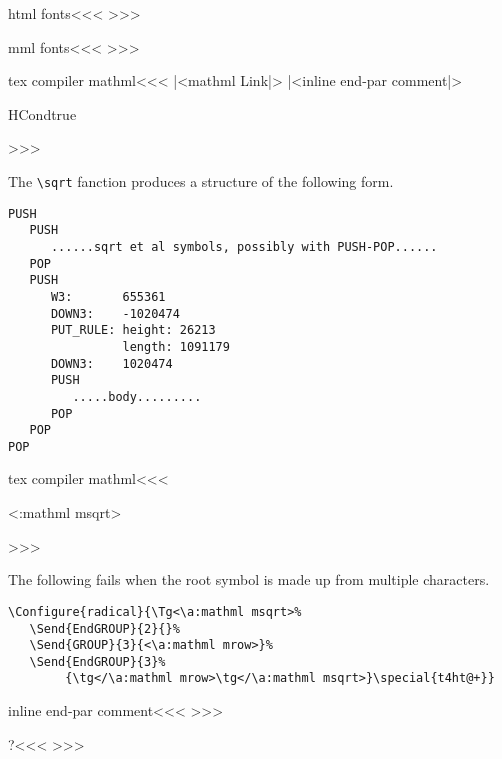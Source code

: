 {{{{{{\<html fonts\><<<
%
>>>

\<mml fonts\><<<
%
>>>

\<tex compiler mathml\><<<
\newif\ifmathml \mathmlfalse
\newif\ifmtext \mtextfalse
|<mathml Link|>
\def\IgnoreRule{\ht:special{t4ht@\string_}}
\def\EndIgnoreRule{\ht:special{t4ht@\string_\string_}}
\Configure{$$} 
   {\IgnorePar
    |<inline end-par comment|>\EndP\DviMath}
   {\EndDviMath\ShowPar\par{\csname HCondtrue\endcsname\noindent}}
   {\DisplayMathtrue}
\Configure{$}
   {\DviMath}
   {\EndDviMath}{}
\newif\ifDisplayMath  \DisplayMathfalse
>>>


The \verb+\sqrt+ fanction produces a structure of the following form.

\begin{verbatim}
PUSH
   PUSH
      ......sqrt et al symbols, possibly with PUSH-POP......
   POP
   PUSH
      W3:       655361
      DOWN3:    -1020474
      PUT_RULE: height: 26213
                length: 1091179
      DOWN3:    1020474
      PUSH
         .....body.........
      POP
   POP
POP
\end{verbatim}



\<tex compiler mathml\><<<
  {\Tg<\a:mathml msqrt>%
  }
>>>

The following fails when the root symbol is made up
from multiple characters.

\begin{verbatim}
\Configure{radical}{\Tg<\a:mathml msqrt>%
   \Send{EndGROUP}{2}{}%
   \Send{GROUP}{3}{<\a:mathml mrow>}%
   \Send{EndGROUP}{3}%
        {\tg</\a:mathml mrow>\tg</\a:mathml msqrt>}\special{t4ht@+}}
\end{verbatim}




\<inline end-par comment\><<<
\ifvmode\else {}\fi
>>>


\<?\><<<
\def\MathRow#1{%
   \Configure{\expandafter\:gobble\string#1*}{*}%
      {<\a:mathml mrow\Hnewline 
         \mml:class="\expandafter\:gobble\string#1">}{</\a:mathml mrow>}%
      {\Configure{\expandafter\:gobble\string#1}{}{}{}{}}#1}%
>>>


}}}}}}
